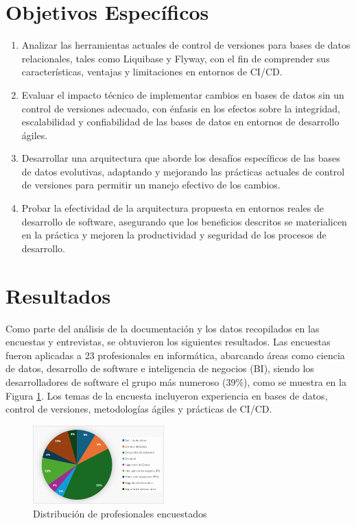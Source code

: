 \documentclass{IEEEtran}
\begin{document}
\section{Objetivos Específicos}
\begin{enumerate}
    \item Analizar las herramientas actuales de control de versiones para bases de datos relacionales, tales como Liquibase y Flyway, con el fin de comprender sus características, ventajas y limitaciones en entornos de CI/CD.
    \item Evaluar el impacto técnico de implementar cambios en bases de datos sin un control de versiones adecuado, con énfasis en los efectos sobre la integridad, escalabilidad y confiabilidad de las bases de datos en entornos de desarrollo ágiles.
    \item Desarrollar una arquitectura que aborde los desafíos específicos de las bases de datos evolutivas, adaptando y mejorando las prácticas actuales de control de versiones para permitir un manejo efectivo de los cambios.
    \item Probar la efectividad de la arquitectura propuesta en entornos reales de desarrollo de software, asegurando que los beneficios descritos se materialicen en la práctica y mejoren la productividad y seguridad de los procesos de desarrollo.
\end{enumerate}

\section{Resultados}
Como parte del análisis de la documentación y los datos recopilados en las encuestas y entrevistas, se obtuvieron los siguientes resultados. Las encuestas fueron aplicadas a 23 profesionales en informática, abarcando áreas como ciencia de datos, desarrollo de software e inteligencia de negocios (BI), siendo los desarrolladores de software el grupo más numeroso (39\%), como se muestra en la Figura \ref{fig:profesionalsDistribution}. Los temas de la encuesta incluyeron experiencia en bases de datos, control de versiones, metodologías ágiles y prácticas de CI/CD.

\begin{figure}[H]
    \centering
    \includegraphics[width=0.45\textwidth]{images/profesionalsDistribution.png}
    \caption{Distribución de profesionales encuestados}
    \label{fig:profesionalsDistribution}
\end{figure}
\end{document}
